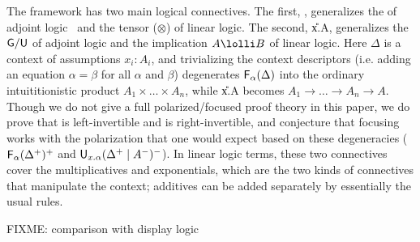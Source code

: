 The framework has two main logical connectives.  The first,
\F{\alpha}{\Delta}, generalizes the  of adjoint
logic~\citep{bentonwadler96adjoint,reed09adjoint} and the tensor
($\otimes$) of linear logic.  The second, \U{x.\alpha}{\Delta}{A},
generalizes the $\mathsf{G}/\mathsf{U}$ of adjoint logic and the implication
$A \lolli B$ of linear logic.  Here $\Delta$ is a context of assumptions
$x_i:A_i$, and trivializing the context descriptors (i.e. adding an
equation $\alpha = \beta$ for all $\alpha$ and $\beta$) degenerates
$\mathsf{F}_{\alpha}(\Delta)$ into the ordinary intuititionistic product $A_1
\times \ldots \times A_n$, while \U{x.\alpha}{\Delta}{A} becomes $A_1
\to \ldots \to A_n \to A$.  Though we do not give a full
polarized/focused proof theory in this paper, we do prove that 
is left-invertible and  is right-invertible, and conjecture that
focusing works with the polarization that one would expect based on
these degeneracies ($\mathsf{F}_{\alpha}(\Delta^{\mathord{+}})^{\mathord{+}}$ and
$\mathsf{U}_{x.\alpha}(\Delta^{\mathord{+}} \mid A^{\mathord{-}})^{\mathord{-}}$).
In linear logic terms, these two connectives cover the multiplicatives
and exponentials, which are the two kinds of connectives that manipulate
the context; additives can be added separately by essentially the usual
rules.

  FIXME: comparison with display logic
